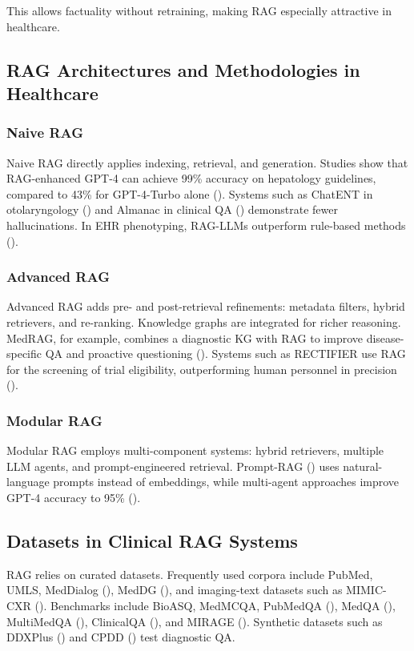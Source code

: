 This allows factuality without retraining, making RAG especially attractive in healthcare.

\subsection{RAG Architectures and Methodologies in Healthcare}

\subsubsection{Naive RAG}
Naive RAG directly applies indexing, retrieval, and generation. Studies show that RAG-enhanced GPT-4 can achieve 99\% accuracy on hepatology guidelines, compared to 43\% for GPT-4-Turbo alone (\citep{li2024liversa}). Systems such as ChatENT in otolaryngology (\citep{zhang2024chatent}) and Almanac in clinical QA (\citep{singhal2023almanac}) demonstrate fewer hallucinations. In EHR phenotyping, RAG-LLMs outperform rule-based methods (\citep{wu2024ragphenotype}).

\subsubsection{Advanced RAG}
Advanced RAG adds pre- and post-retrieval refinements: metadata filters, hybrid retrievers, and re-ranking. Knowledge graphs are integrated for richer reasoning. MedRAG, for example, combines a diagnostic KG with RAG to improve disease-specific QA and proactive questioning (\citep{zhao2025medrag}). Systems such as RECTIFIER use RAG for the screening of trial eligibility, outperforming human personnel in precision (\citep{wang2024rectifier}).

\subsubsection{Modular RAG}
Modular RAG employs multi-component systems: hybrid retrievers, multiple LLM agents, and prompt-engineered retrieval. Prompt-RAG (\citep{kim2024promptrag}) uses natural-language prompts instead of embeddings, while multi-agent approaches improve GPT-4 accuracy to 95\% (\citep{sun2025agenticrag}).

\subsection{Datasets in Clinical RAG Systems}

RAG relies on curated datasets. Frequently used corpora include PubMed, UMLS, MedDialog (\citep{chen2020meddialog}), MedDG (\citep{li2020meddg}), and imaging-text datasets such as MIMIC-CXR (\citep{johnson2019mimiccxr}). Benchmarks include BioASQ, MedMCQA, PubMedQA (\citep{jin2019pubmedqa}), MedQA (\citep{jin2021medqa}), MultiMedQA (\citep{singhal2023multimedqa}), ClinicalQA (\citep{abacha2021nlmclinicalqa}), and MIRAGE (\citep{zhu2023mirage}). Synthetic datasets such as DDXPlus (\citep{liu2023ddxplus}) and CPDD (\citep{zhao2025medrag}) test diagnostic QA.

